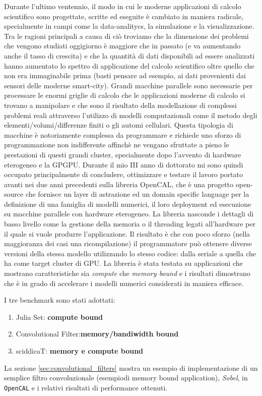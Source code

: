 Durante l’ultimo ventennio, il modo in cui le moderne applicazioni di calcolo scientifico sono progettate, scritte ed eseguite è cambiato in maniera 
radicale, specialmente in campi come la data-analitycs, la simulazione e la 
visualizzazione. Tra le ragioni principali a causa di ciò troviamo che la dimensione dei problemi che vengono studiati oggigiorno è maggiore che in 
passato (e va aumentando anche il tasso di crescita) e che la quantità di dati 
disponibili ad essere analizzati hanno aumentato lo spettro di applicazione 
del calcolo scientifico oltre quello che non era immaginabile prima (basti 
pensare ad esempio, ai dati provenienti dai sensori delle moderne smart-city). Grandi macchine parallele sono necessarie per processare le enormi 
griglie di calcolo che le applicazioni moderne di calcolo si trovano a manipolare e che sono il risultato della modellazione di complessi problemi 
reali attraverso l’utilizzo di modelli computazionali come il metodo degli elementi/volumi/differenze finiti o gli automi cellulari. Questa tipologia di 
macchine è notoriamente complessa da programmare e richiede uno sforzo 
di programmazione non indifferente affinchè ne vengano sfruttate a pieno 
le prestazioni di questi grandi cluster, specialmente dopo l’avvento di hardware eterogeneo e la GPGPU. Durante il mio III anno di dottorato mi sono 
quindi occupato principalmente di concludere, ottimizzare e testare il lavoro 
portato avanti nei due anni precedenti sulla libreria OpenCAL, che è una 
progetto open-source che fornisce un layer di astrazione ed un domain specific language per la definizione di una famiglia di modelli numerici, il loro 
deployment ed esecuzione su macchine parallele con hardware eterogeneo. 
La libreria nasconde i dettagli di basso livello come la gestione della memoria 
o il threading legati all’hardware per il quale si vuole produrre l’applicazione. 
Il risultato è che con poco sforzo (nella maggioranza dei casi una ricompilazione) il programmatore può ottenere diverse versioni della stessa modello utilizzando lo stesso codice: dalla seriale a quella che ha come target cluster 
di GPU. La libreria è stata testata su applicazioni che mostrano caratteristiche sia \textit{compute} che \textit{memory bound} e i risultati dimostrano che è in grado 
di accelerare i modelli numerici considerati in maniera efficace.

I tre benchmark sono stati adottati:
\begin{enumerate}
	\item Julia Set: \textbf{compute bound}
	\item Convolutional Filter:\textbf{memory/bandiwidth bound}
	\item sciddicaT: \textbf{memory e compute bound}
\end{enumerate} 
La sezione \ref{sec:convolutional_filters} mostra un esempio di implementazione di un semplice filtro convoluzionale (esempiodi memory bound application), \textit{Sobel}, in \texttt{OpenCAL} e i relativi risultati di performance ottenuti.


